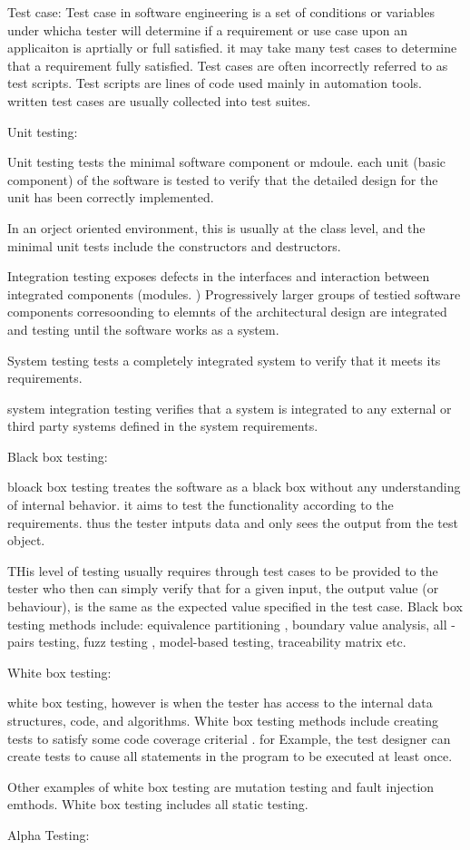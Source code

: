 Test case:
Test case in software engineering is a set of conditions or variables under whicha tester will determine if a requirement or use case upon an applicaiton is aprtially or full satisfied. 
it may take many test cases to determine that a requirement fully satisfied. Test cases are often incorrectly referred
to as test scripts. Test scripts are lines of code used mainly in automation tools. written test cases are usually collected into test suites. 


Unit testing:

Unit testing tests the minimal software component or mdoule. each unit (basic component) of the software is tested to verify that the detailed design for the unit has been correctly implemented. 

In an orject oriented environment, this is usually at the class level, and the minimal unit tests include the constructors and destructors. 

Integration testing exposes defects in the interfaces and interaction between integrated components (modules. ) Progressively larger groups of testied software components corresoonding to elemnts of the architectural design are integrated and 
testing until the software works as a system. 

System testing tests a completely integrated system to verify that it meets its requirements. 

system integration testing verifies that a system is integrated to any external or third party systems defined in the system 
requirements. 

Black box testing:

bloack box testing treates the software as a black box without any understanding of internal behavior. it aims to test the functionality according
to the requirements. thus the tester intputs data and only sees the output from the test object. 

THis level of testing usually requires through test cases to be provided to the tester who then can simply verify that for a given input, the output value (or behaviour),
is the same as the expected value specified in the test case. Black box testing methods include: equivalence partitioning , boundary value analysis, all - pairs testing, 
fuzz testing , model-based testing, traceability matrix etc. 


White box testing: 

white box testing, however is when the tester has access to the internal data structures, code, and algorithms. White box testing methods include
creating tests to satisfy some code coverage criterial . for Example, the test designer can create tests to cause all statements in the program to be executed at least once. 

Other examples of white box testing are mutation testing and fault injection emthods. 
White box testing includes all static testing. 


Alpha Testing: 


